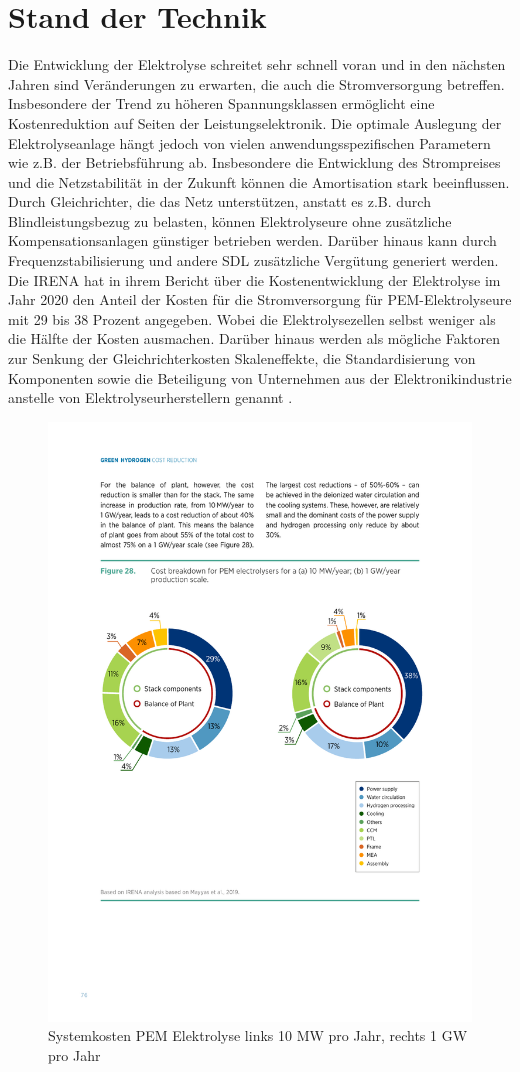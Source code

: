 \section{Stand der Technik}
 Die Entwicklung der Elektrolyse schreitet sehr schnell voran und in den nächsten Jahren sind Veränderungen zu erwarten, die auch die Stromversorgung betreffen. Insbesondere der Trend zu höheren Spannungsklassen ermöglicht eine Kostenreduktion auf Seiten der Leistungselektronik. Die optimale Auslegung der Elektrolyseanlage hängt jedoch von vielen anwendungsspezifischen Parametern wie z.B. der Betriebsführung ab. Insbesondere die Entwicklung des Strompreises und die Netzstabilität in der Zukunft können die Amortisation stark beeinflussen. Durch Gleichrichter, die das Netz unterstützen, anstatt es z.B. durch Blindleistungsbezug zu belasten, können Elektrolyseure ohne zusätzliche Kompensationsanlagen günstiger betrieben werden. Darüber hinaus kann durch Frequenzstabilisierung und andere \gls{SDL} zusätzliche Vergütung generiert werden. \\
Die \gls{IRENA} hat in ihrem Bericht über die Kostenentwicklung der Elektrolyse im Jahr 2020 den Anteil der Kosten für die Stromversorgung für \gls{PEM}-Elektrolyseure mit 29 bis 38 Prozent angegeben. Wobei die Elektrolysezellen selbst weniger als die Hälfte der Kosten ausmachen. Darüber hinaus werden als mögliche Faktoren zur Senkung der Gleichrichterkosten Skaleneffekte, die Standardisierung von Komponenten sowie die Beteiligung von Unternehmen aus der Elektronikindustrie anstelle von Elektrolyseurherstellern genannt \cite{IRENA2020}.\\ 
	\begin{figure} [H]
		\centering
		\includegraphics[width=0.7\linewidth]{content/Grafiken/ElyCost}
		\caption[Systemkosten PEM Elektrolyse]{Systemkosten \gls{PEM} Elektrolyse links 10 MW pro Jahr, rechts 1 GW pro Jahr \cite{IRENA2020}}
		\label{fig:elycost}
	\end{figure}
